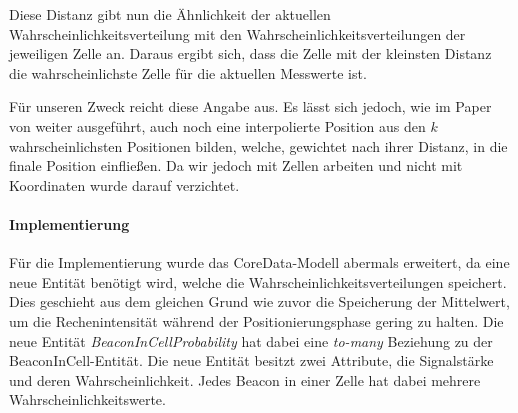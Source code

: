 Diese Distanz gibt nun die Ähnlichkeit der aktuellen Wahrscheinlichkeitsverteilung mit den Wahrscheinlichkeitsverteilungen der jeweiligen Zelle an. Daraus ergibt sich, dass die Zelle mit der kleinsten Distanz die wahrscheinlichste Zelle für die aktuellen Messwerte ist.

Für unseren Zweck reicht diese Angabe aus. Es lässt sich jedoch, wie im Paper von \citet{wifiFingerprintProbability} weiter ausgeführt, auch noch eine interpolierte Position aus den $k$ wahrscheinlichsten Positionen bilden, welche, gewichtet nach ihrer Distanz, in die finale Position einfließen. Da wir jedoch mit Zellen arbeiten und nicht mit Koordinaten wurde darauf verzichtet. 

\paragraph{Implementierung}
\label{sec:implementation:fingerprinting:positioning:probability:implementiation}
Für die Implementierung wurde das CoreData-Modell abermals erweitert, da eine neue Entität benötigt wird, welche die Wahrscheinlichkeitsverteilungen speichert. Dies geschieht aus dem gleichen Grund wie zuvor die Speicherung der Mittelwert, um die Rechenintensität während der Positionierungsphase gering zu halten.
Die neue Entität \emph{BeaconInCellProbability} hat dabei eine \emph{to-many} Beziehung zu der BeaconInCell-Entität. Die neue Entität besitzt zwei Attribute, die Signalstärke und deren Wahrscheinlichkeit. Jedes Beacon in einer Zelle hat dabei mehrere Wahrscheinlichkeitswerte.



